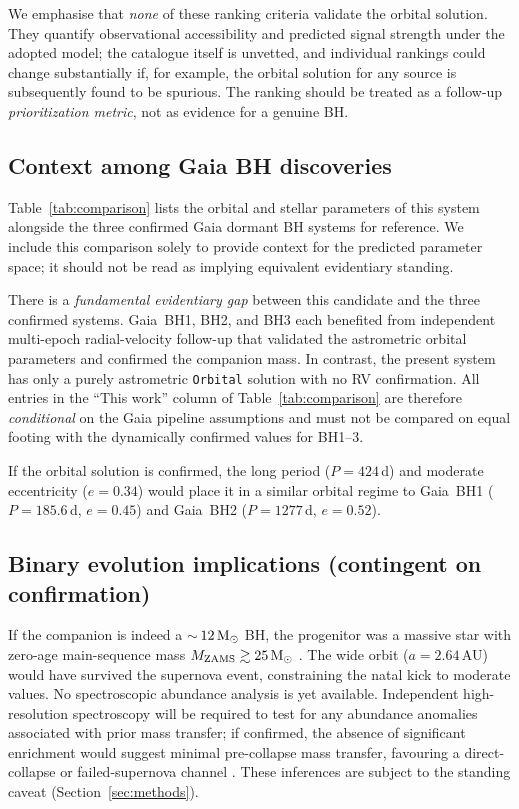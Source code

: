 \documentclass[usenatbib,fleqn]{mnras}
\newcommand{\Msun}{{\rm M}_\odot}
\begin{document}
We emphasise that \emph{none} of these ranking criteria validate
the orbital solution.  They quantify observational accessibility
and predicted signal strength under the adopted model; the
catalogue itself is unvetted, and individual rankings could
change substantially if, for example, the orbital solution for
any source is subsequently found to be spurious.  The ranking
should be treated as a follow-up \emph{prioritization metric},
not as evidence for a genuine BH.

\subsection{Context among Gaia BH discoveries}

Table~\ref{tab:comparison} lists the orbital and stellar parameters
of this system alongside the three confirmed Gaia dormant BH systems
for reference.  We include this comparison solely to provide context
for the predicted parameter space; it should not be read as implying
equivalent evidentiary standing.

There is a \emph{fundamental evidentiary gap} between this
candidate and the three confirmed systems.  Gaia~BH1, BH2, and BH3
each benefited from independent multi-epoch radial-velocity follow-up
that validated the astrometric orbital parameters and confirmed the
companion mass.  In contrast, the present system has only a purely
astrometric \texttt{Orbital} solution with no RV confirmation.
All entries in the ``This work'' column of
Table~\ref{tab:comparison} are therefore \emph{conditional} on
the Gaia pipeline assumptions and must not be compared on equal
footing with the dynamically confirmed values for BH1--3.

If the orbital solution is confirmed, the long period
($P = 424$\,d) and moderate eccentricity ($e = 0.34$) would place
it in a similar orbital regime to Gaia~BH1
($P = 185.6$\,d, $e = 0.45$) and Gaia~BH2 ($P = 1277$\,d,
$e = 0.52$).

\subsection{Binary evolution implications (contingent on confirmation)}

If the companion is indeed a $\sim$\,$12\,\Msun$ BH, the
progenitor was a massive star with zero-age main-sequence
mass $M_{\rm ZAMS} \gtrsim 25\,\Msun$ \citep{Fryer2012}.
The wide orbit ($a = 2.64$\,AU) would have survived the
supernova event, constraining the natal kick to moderate
values.  No spectroscopic abundance analysis is yet available.
Independent high-resolution spectroscopy will be required to test
for any abundance anomalies associated with prior mass transfer;
if confirmed, the absence of significant enrichment would suggest
minimal pre-collapse mass transfer, favouring a direct-collapse or
failed-supernova channel \citep{Langer2020}.
These inferences are subject to the standing caveat
(Section~\ref{sec:methods}).
\end{document}
